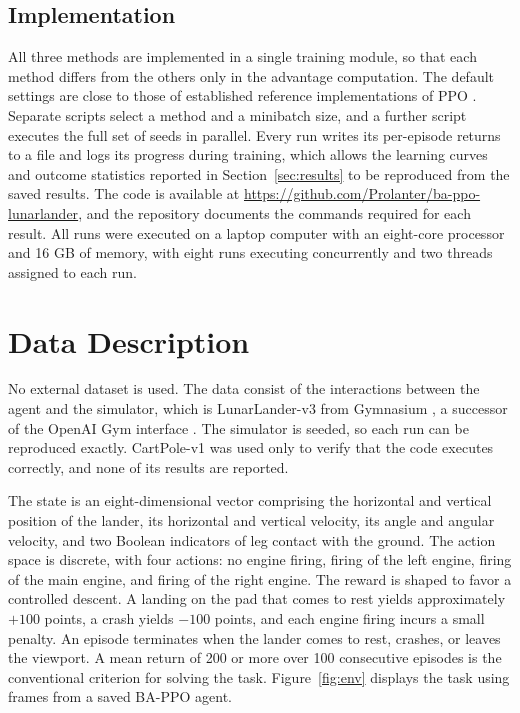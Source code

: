 \documentclass[11pt,a4paper]{article}
\begin{document}
\subsection{Implementation}
\label{sec:implementation}

All three methods are implemented in a single training module, so that each method differs from the others only in the advantage computation. The default settings are close to those of established reference implementations of PPO \cite{huang2022cleanrl,raffin2021sb3}. Separate scripts select a method and a minibatch size, and a further script executes the full set of seeds in parallel. Every run writes its per-episode returns to a file and logs its progress during training, which allows the learning curves and outcome statistics reported in Section~\ref{sec:results} to be reproduced from the saved results. The code is available at \url{https://github.com/Prolanter/ba-ppo-lunarlander}, and the repository documents the commands required for each result. All runs were executed on a laptop computer with an eight-core processor and 16 GB of memory, with eight runs executing concurrently and two threads assigned to each run.

\section{Data Description}
\label{sec:data}

No external dataset is used. The data consist of the interactions between the agent and the simulator, which is LunarLander-v3 from Gymnasium \cite{towers2024gymnasium}, a successor of the OpenAI Gym interface \cite{brockman2016gym}. The simulator is seeded, so each run can be reproduced exactly. CartPole-v1 was used only to verify that the code executes correctly, and none of its results are reported.

The state is an eight-dimensional vector comprising the horizontal and vertical position of the lander, its horizontal and vertical velocity, its angle and angular velocity, and two Boolean indicators of leg contact with the ground. The action space is discrete, with four actions: no engine firing, firing of the left engine, firing of the main engine, and firing of the right engine. The reward is shaped to favor a controlled descent. A landing on the pad that comes to rest yields approximately $+100$ points, a crash yields $-100$ points, and each engine firing incurs a small penalty. An episode terminates when the lander comes to rest, crashes, or leaves the viewport. A mean return of 200 or more over 100 consecutive episodes is the conventional criterion for solving the task. Figure~\ref{fig:env} displays the task using frames from a saved BA-PPO agent.
\end{document}
